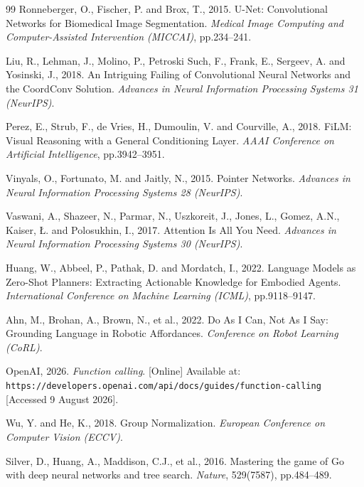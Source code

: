 \begin{thebibliography}{99}
Ronneberger, O., Fischer, P. and Brox, T., 2015.
U-Net: Convolutional Networks for Biomedical Image Segmentation.
\textit{Medical Image Computing and Computer-Assisted Intervention (MICCAI)},
pp.234--241.

Liu, R., Lehman, J., Molino, P., Petroski Such, F., Frank, E., Sergeev, A. and
Yosinski, J., 2018.
An Intriguing Failing of Convolutional Neural Networks and the CoordConv Solution.
\textit{Advances in Neural Information Processing Systems 31 (NeurIPS)}.

Perez, E., Strub, F., de Vries, H., Dumoulin, V. and Courville, A., 2018.
FiLM: Visual Reasoning with a General Conditioning Layer.
\textit{AAAI Conference on Artificial Intelligence}, pp.3942--3951.

Vinyals, O., Fortunato, M. and Jaitly, N., 2015.
Pointer Networks.
\textit{Advances in Neural Information Processing Systems 28 (NeurIPS)}.

Vaswani, A., Shazeer, N., Parmar, N., Uszkoreit, J., Jones, L., Gomez, A.N.,
Kaiser, {\L}. and Polosukhin, I., 2017.
Attention Is All You Need.
\textit{Advances in Neural Information Processing Systems 30 (NeurIPS)}.

Huang, W., Abbeel, P., Pathak, D. and Mordatch, I., 2022.
Language Models as Zero-Shot Planners: Extracting Actionable Knowledge for
Embodied Agents.
\textit{International Conference on Machine Learning (ICML)}, pp.9118--9147.

Ahn, M., Brohan, A., Brown, N., et al., 2022.
Do As I Can, Not As I Say: Grounding Language in Robotic Affordances.
\textit{Conference on Robot Learning (CoRL)}.

OpenAI, 2026. \textit{Function calling}. [Online]
Available at: \texttt{https://developers.openai.com/api/docs/guides/function-calling}
[Accessed 9 August 2026].

Wu, Y. and He, K., 2018.
Group Normalization.
\textit{European Conference on Computer Vision (ECCV)}.

Silver, D., Huang, A., Maddison, C.J., et al., 2016.
Mastering the game of Go with deep neural networks and tree search.
\textit{Nature}, 529(7587), pp.484--489.


\end{thebibliography}
